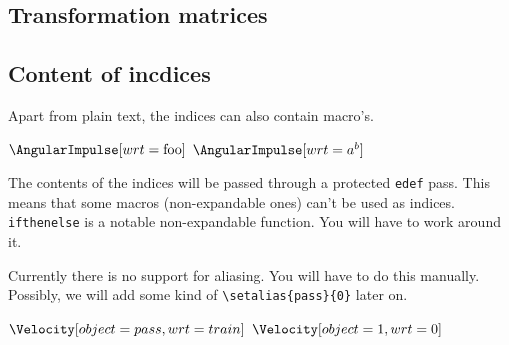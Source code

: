 \documentclass[10pt,a4paper]{article}
\begin{document}
\begin{SideBySideExample}[xrightmargin=1.2cm,frame=single]
  {
    \let\vectorformatter\VECTORPRETTYDEFAULT
    \AngularImpulse[object=1,wrt=0,around=3,expressedIn=4]
    \AngularImpulse[object=1,wrt=0,around=3,expressedIn=4,diff=4]
    \let\vectorformatter\VECTORFLAT
    \AngularImpulse[object=1,wrt=0,around=3,expressedIn=4]
    \AngularImpulse[object=1,wrt=0,around=3,expressedIn=4,diff=4]
  }
\end{SideBySideExample}

\subsection{Transformation matrices}

\begin{SideBySideExample}[xrightmargin=1cm,frame=single]
  \Transformation[frame=2,wrt=0,expressedIn=0]
  \Transformation[frame=2,wrt=0,expressedIn=1]
\end{SideBySideExample}

\subsection{Content of incdices}

Apart from plain text, the indices can also contain macro's.
\begin{SideBySideExample}[xrightmargin=1cm,frame=single]
  \def\foo{0}
  \AngularImpulse[wrt=\foo]
  \newcommand{\frm}[1]{{\{#1\}}}
  \AngularImpulse[wrt=\frm{0}]
  \AngularImpulse[wrt=a\frm{0}c]
  $\AngularImpulse[wrt=\mathrm{foo}]$
  $\AngularImpulse[wrt=a^b]$
\end{SideBySideExample}

The contents of the indices will be passed through a protected \verb+edef+ pass. This means that some macros (non-expandable ones) can't be used as indices. \verb+ifthenelse+ is a notable non-expandable function. You will have to work around it.

\begin{SideBySideExample}[xrightmargin=2cm,frame=single]
  \AngularImpulse[wrt=\mywrt]
\end{SideBySideExample}

Currently there is no support for aliasing. You will have to do this manually. Possibly, we will add some kind of \verb+\setalias{pass}{0}+ later on.

\begin{SideBySideExample}[xrightmargin=1cm,frame=single]
  \def\pass{pass}
  \def\train{train}
  $\Velocity[object=\pass,wrt=\train]$
  \def\pass{1}
  \def\train{0}
  $\Velocity[object=\pass,wrt=\train]$
\end{SideBySideExample}
\end{document}
